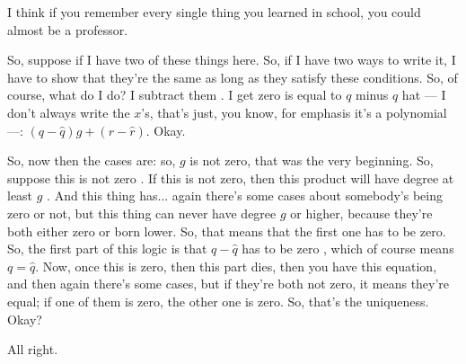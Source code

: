\begin{speech}[00:30:46 - 00:32:21]
I think if you remember every single thing you learned in school, you could almost be a professor.

So, suppose if I have two of these things here. So, if I have two ways to write it, I have to show that they're the same as long as they satisfy these conditions. So, of course, what do I do? I subtract them . I get zero is equal to $q$ minus $q$ hat --- I don't always write the $x$'s, that's just, you know, for emphasis it's a polynomial ---: $(q - \hat{q})g + (r - \hat{r})$. Okay.

So, now then the cases are: so, $g$ is not zero, that was the very beginning. So, suppose this is not zero . If this is not zero, then this product will have degree at least $g$ . And this thing has... again there's some cases about somebody's being zero or not, but this thing can never have degree $g$ or higher, because they're both either zero or born lower. So, that means that the first one has to be zero. So, the first part of this logic is that $q - \hat{q}$ has to be zero , which of course means $q = \hat{q}$. Now, once this is zero, then this part dies, then you have this equation, and then again there's some cases, but if they're both not zero, it means they're equal; if one of them is zero, the other one is zero. So, that's the uniqueness. Okay?

All right. 
\end{speech}

